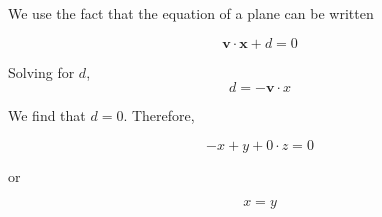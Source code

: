 \documentclass{article}
\begin{document}
We use the fact that the equation of a plane can be written

$$\bm{v} \cdot \bm{x} + d = 0$$

Solving for $d$,
$$
d = - \bm{v} \cdot {x}
$$



We find that $d=0$.
Therefore,

$$
-x + y + 0 \cdot z = 0
$$

or

$$
x = y
$$
\end{document}
